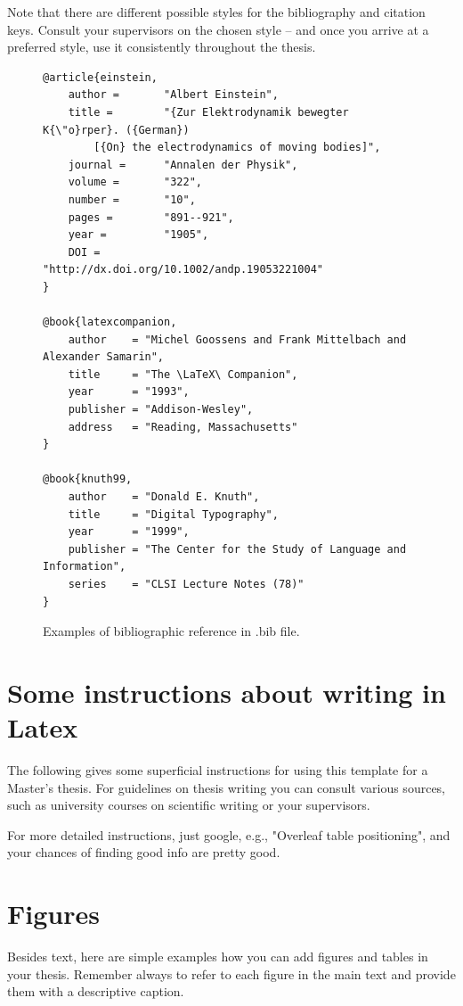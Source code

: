 Note that there are different possible styles for the bibliography and citation keys.
%
Consult your supervisors on the chosen style -- and once you arrive at a preferred style, use it consistently throughout the thesis.

\begin{figure}[ht]
    \centering
    \begin{scriptsize}
\begin{verbatim}
@article{einstein,
    author =       "Albert Einstein",
    title =        "{Zur Elektrodynamik bewegter K{\"o}rper}. ({German})
        [{On} the electrodynamics of moving bodies]",
    journal =      "Annalen der Physik",
    volume =       "322",
    number =       "10",
    pages =        "891--921",
    year =         "1905",
    DOI =          "http://dx.doi.org/10.1002/andp.19053221004"
}

@book{latexcompanion,
    author    = "Michel Goossens and Frank Mittelbach and Alexander Samarin",
    title     = "The \LaTeX\ Companion",
    year      = "1993",
    publisher = "Addison-Wesley",
    address   = "Reading, Massachusetts"
}

@book{knuth99,
    author    = "Donald E. Knuth",
    title     = "Digital Typography",
    year      = "1999",
    publisher = "The Center for the Study of Language and Information",
    series    = "CLSI Lecture Notes (78)"
}\end{verbatim}
\end{scriptsize}
    \caption{Examples of bibliographic reference in .bib file.}
    \label{bibexamples}
\end{figure}


\section{Some instructions about writing in Latex}

The following gives some superficial instructions for using this template for a Master's thesis. For guidelines on thesis writing you can consult various sources, such as university courses on scientific writing or your supervisors.

For more detailed instructions, just google, e.g., "Overleaf table positioning", and your chances of finding good info are pretty good.


\section{Figures}
Besides text, here are simple examples how you can add figures and tables in your thesis.
Remember always to refer to each figure in the main text and provide them with a descriptive caption.

